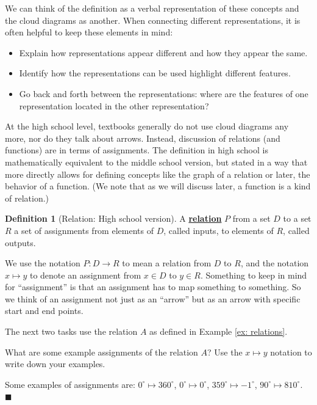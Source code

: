 \documentclass[11pt]{article}
\newenvironment{task}
	{\begin{mdframed}[linecolor=lightgray, linewidth=3pt]\raggedright}
	{\end{mdframed}}
\newcommand\degrees{^\circ}
\renewcommand\emph[1]{\underline{\bf{#1}}} %
\theoremstyle{definition}
\newtheorem{definition}[theorem]{Definition}
\newenvironment{solution}{{\it Solution.} }{\hfill {\color{lightgray}$\blacksquare$}}
\begin{document}
We can think of the definition as a verbal representation of these concepts and the cloud diagrams as another. When connecting different representations, it is often helpful to keep these elements in mind:

\begin{itemize}
\item Explain how representations appear different and how they appear the same.
\item Identify how the representations can be used highlight different features. 
\item Go back and forth between the representations: where are the features of one representation located in the other representation?
\end{itemize}

At the high school level, textbooks generally do not use cloud diagrams any more, nor do they talk about arrows. Instead, discussion of relations (and functions) are in terms of assignments. The definition in high school is mathematically equivalent to the middle school version, but stated in a way that more directly allows for defining concepts like the graph of a relation or later, the behavior of a function.  (We note that as we will discuss later, a function is a kind of relation.)

\begin{definition}[Relation: High school version]\label{d: relation high school}
A \emph{relation} $P$ from a set $D$ to a set $R$ a set of assignments from elements of $D$, called inputs, to elements of $R$, called outputs.
\end{definition}

\begin{note}
We use the notation $P:D\to R$ to mean a relation from $D$ to $R$, and the notation $x\mapsto y$ to denote an assignment from $x\in D$ to $y\in R$. Something to keep in mind for ``assignment'' is that an assignment has to map something to something. So we think of an assignment not just as an ``arrow'' but as an arrow with specific start and end points.
\end{note}

The next two tasks use the relation $A$ as defined in Example \ref{ex: relations}.

\begin{task}
What are some example assignments of the relation $A$? Use the $x\mapsto y$ notation to write down your examples. 
\end{task}

\begin{solution}
Some examples of assignments are: $0\degrees \mapsto 360\degrees$, $0\degrees \mapsto 0\degrees$, $359\degrees \mapsto -1\degrees$, $90\degrees \mapsto 810\degrees$.
\end{solution}
\end{document}
